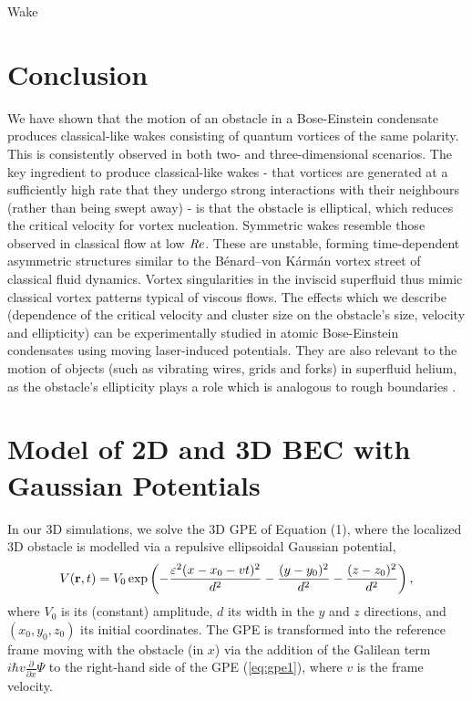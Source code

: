 \begin{chapter}{\label{cha:wake}Wake}
\section{Conclusion}
We have shown that the motion of an obstacle in a Bose-Einstein condensate produces classical-like wakes consisting of quantum vortices of the same polarity.  This is consistently observed in both two- and three-dimensional scenarios.  The key ingredient to produce classical-like wakes - that vortices are generated at a sufficiently high rate that they undergo strong interactions with their neighbours  (rather than being swept away) - is that the obstacle is elliptical, which reduces the critical velocity for vortex nucleation.  Symmetric wakes resemble those observed in classical flow at low $\mbox{\ensuremath{\mathit{Re}}}$.  These are unstable, forming time-dependent asymmetric structures similar to the B\'enard--von K\'arm\'an vortex street of classical fluid dynamics. Vortex singularities
in the inviscid superfluid thus mimic classical vortex patterns typical of viscous flows.  The effects which we describe (dependence of the critical velocity and cluster size on the obstacle's size, velocity and ellipticity) can be experimentally studied in atomic Bose-Einstein condensates using moving laser-induced potentials. They are also relevant to the motion of objects (such as vibrating wires, grids and forks) in superfluid helium, as the obstacle's ellipticity plays a role which is analogous to rough boundaries \cite{blaz08,brad05}. 
\\
\section{Model of 2D and 3D BEC with Gaussian Potentials}

In our 3D simulations, we solve the 3D GPE of Equation (1), where the localized 3D obstacle is modelled via a repulsive ellipsoidal Gaussian potential,
\begin{equation}
V({\bf r}, t)=V_0 \exp \left( -\frac{\varepsilon^2(x-x_0-vt)^2}{d^2} -\frac{(y-y_0)^2}{d^2}-\frac{(z-z_0)^2}{d^2}\right),
\label{eq:potential3D}
\end{equation}
where  $V_0$ is its (constant) amplitude, $d$ its width in the $y$ and $z$ directions, and $(x_0,y_0,z_0)$ its initial coordinates.  The GPE is transformed into the reference frame moving with the obstacle (in $x$) via the addition of the Galilean term $ i\hbar v\frac{\partial}{\partial x} \Psi$ to the right-hand side of the GPE (\ref{eq:gpe1}), where $v$ is the frame velocity.  


\end{chapter}

